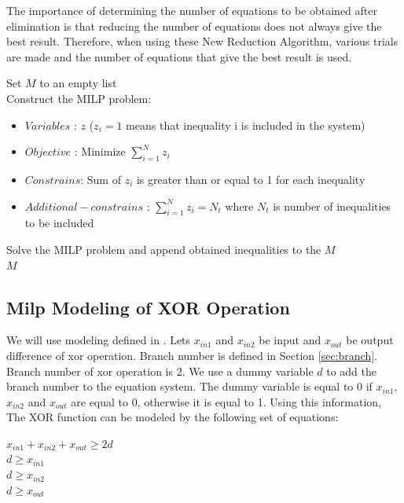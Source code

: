 The importance of determining the number of equations to be obtained after elimination is that reducing the number of equations does not always give the best result. Therefore, when using these New Reduction Algorithm, various trials are made and the number of equations that give the best result is used.

\begin{algorithm}[H]
    \DontPrintSemicolon
    \caption{Pseudo-code for New Reduction Algorithm }
    \label{alg:newreduction}
    Set $M$ to an empty list \\
    Construct the MILP problem: 
    \begin{itemize}
        \item $Variables$ : $z$ ($z_i =1 $ means that inequality i is included in the system) 
        \item $Objective$ : Minimize  $ \sum_{i=1}^{N} z_i $	
        \item $Constrains$: Sum of $z_i$ is greater than or equal to 1 for each inequality 
        \item $Additional-constrains$ : $ \sum_{i=1}^{N} z_i = N_t $ where $N_t$ is number of inequalities to be included
    \end{itemize}
    Solve the MILP problem and append obtained inequalities to the $M$ \\
    \Return $M$
\end{algorithm}

\subsection{Milp Modeling of XOR Operation }
We will use modeling defined in \cite{mouha2012differential}. Lets $x_{in1}$ and $x_{in2}$ be input and $x_{out}$ be output difference of xor operation. Branch number is defined in Section \ref{sec:branch}. Branch number of xor operation is 2. We use a dummy variable $d$ to add the branch number to the equation system. The dummy variable is equal to 0 if $x_{in1}$, $x_{in2}$ and $x_{out}$ are equal to 0, otherwise it is equal to 1. Using this information, The XOR function can be modeled by the following set of equations:

\begin{center}
    $x_{in1} + x_{in2} + x_{out} \geq 2d $ \\
    $d \geq x_{in1} $ \\
    $d \geq x_{in2} $ \\
    $d \geq x_{out} $ 
\end{center}

